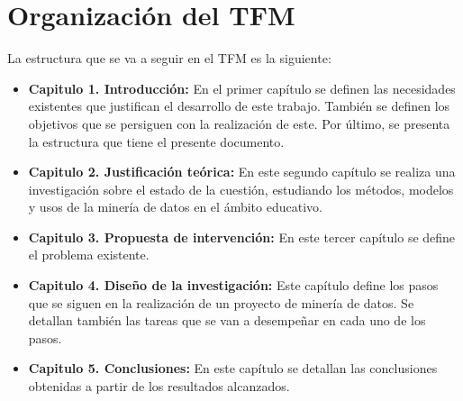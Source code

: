 \section{Organización del TFM}
La estructura que se va a seguir en el TFM es la siguiente:
\begin{itemize}
	\item \textbf{Capitulo 1. Introducción:} En el primer capítulo se definen las necesidades existentes que justifican el desarrollo de este trabajo. También se definen los objetivos que se persiguen con la realización de este. Por último, se presenta la estructura que tiene el presente documento.
	\item \textbf{Capitulo 2. Justificación teórica:} En este segundo capítulo se realiza una investigación sobre el estado de la cuestión, estudiando los métodos, modelos y usos de la minería de datos en el ámbito educativo. 
	\item \textbf{Capitulo 3. Propuesta de intervención:} En este tercer capítulo se define el problema existente.
	\item \textbf{Capitulo 4. Diseño de la investigación:} Este capítulo define los pasos que se siguen en la realización de un proyecto de minería de datos. Se detallan también las tareas que se van a desempeñar en cada uno de los pasos.
	\item \textbf{Capitulo 5. Conclusiones:} En este capítulo se detallan las conclusiones obtenidas a partir de los resultados alcanzados.
\end{itemize}




